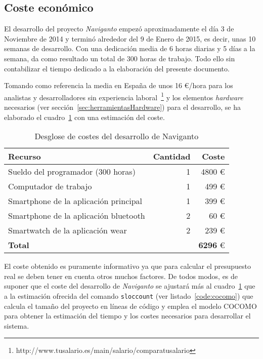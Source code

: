\subsection{Coste económico}

El desarrollo del proyecto \emph{Naviganto} empezó aproximadamente el día 3 de Noviembre de 2014 y
terminó alrededor del 9 de Enero de 2015, es decir, unas 10 semanas de desarrollo. Con una
dedicación media de 6 horas diarias y 5 días a la semana, da como resultado un total de 300 horas de
trabajo. Todo ello sin contabilizar el tiempo dedicado a la elaboración del presente documento.

Tomando como referencia la media en España de unos 16 \euro/hora para los analistas y
desarrolladores sin experiencia
laboral~\footnote{http://www.tusalario.es/main/salario/comparatusalario} y los elementos
\emph{hardware} necesarios (ver sección~\ref{sec:herramientasHardware}) para el desarrollo, se ha
elaborado el cuadro~\ref{cuadro:costes} con una estimación del coste.

\begin{table}[h]
  \centering
  \begin{tabular}{|l|r|r|}
    \hline
    \textbf{Recurso} & \textbf{Cantidad} & \textbf{Coste} \\
    \hline
    Sueldo del programador (300 horas)     & 1 &          4800 \euro \\
    \hline
    Computador de trabajo                  & 1 &           499 \euro \\
    \hline
    Smartphone de la aplicación principal  & 1 &           399 \euro \\
    \hline
    Smartphone de la aplicación bluetooth  & 2 &            60 \euro \\
    \hline
    Smartwatch de la aplicación wear       & 2 &           239 \euro \\
    \hline
    \textbf{Total}                         &   & \textbf{6296} \euro \\
    \hline
  \end{tabular}
  \caption{Desglose de costes del desarrollo de Naviganto}
  \label{cuadro:costes}
\end{table}

El coste obtenido es puramente informativo ya que para calcular el presupuesto real se deben tener
en cuenta otros muchos factores. De todos modos, es de suponer que el coste del desarrollo de
\emph{Naviganto} se ajustará más al cuadro~\ref{cuadro:costes} que a la estimación ofrecida del
comando \texttt{sloccount} (ver listado~\ref{code:cocomo}) que calcula el tamaño del proyecto en
líneas de código y emplea el modelo \acf{COCOMO} para obtener la estimación del tiempo y los costes
necesarios para desarrollar el sistema.

